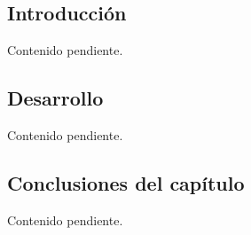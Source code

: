 %
%

\chapter{\TituloCapSeis}
\label{cap:06}

\section{Introducción}
\label{sec:cap06:introduccion}

Contenido pendiente.

\section{Desarrollo}
\label{sec:cap06:desarrollo}

Contenido pendiente.



\section{Conclusiones del capítulo}
\label{sec:cap06onclusiones}

Contenido pendiente.
